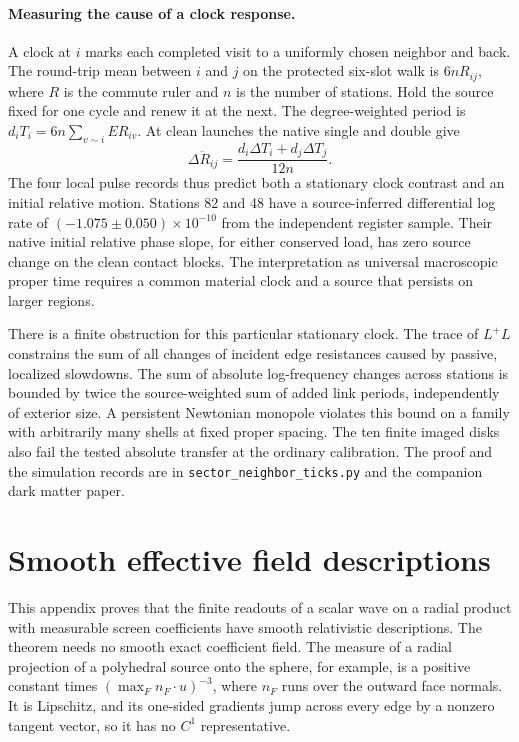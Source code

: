 \documentclass[11pt]{article}
\begin{document}
\paragraph{Measuring the cause of a clock response.}
A clock at \(i\) marks each completed visit to a uniformly chosen
neighbor and back. The round-trip mean between \(i\) and \(j\) on
the protected six-slot walk is \(6nR_{ij}\), where \(R\) is the
commute ruler and \(n\) is the number of stations. Hold the source
fixed for one cycle and renew it at the next. The degree-weighted
period is \(d_i T_i=6n\sum_{v\sim i}E R_{iv}\). At clean launches
the native single and double give
\[
  \Delta\ddot R_{ij}
    =\frac{d_i\Delta T_i+d_j\Delta T_j}{12n}.
\]
The four local pulse records thus predict both a stationary clock
contrast and an initial relative motion. Stations 82 and 48 have a
source-inferred differential log rate of
\((-1.075\pm0.050)\times10^{-10}\) from the independent register
sample. Their native initial relative phase slope, for either
conserved load, has zero source change on the clean contact blocks.
The interpretation as universal macroscopic proper time requires
a common material clock and a source that persists on larger regions.

There is a finite obstruction for this particular stationary clock.
The trace of \(L^+L\) constrains the sum of all changes of incident
edge resistances caused by passive, localized slowdowns. The sum of
absolute log-frequency changes across stations is bounded by twice
the source-weighted sum of added link periods, independently of
exterior size. A persistent Newtonian monopole violates this bound
on a family with arbitrarily many shells at fixed proper spacing.
The ten finite imaged disks also fail the tested absolute transfer
at the ordinary calibration. The proof and the simulation records
are in \texttt{sector\_neighbor\_ticks.py} and the companion dark
matter paper.

\appendix

\section{Smooth effective field descriptions}
\label{app:smooth-effective-descriptions}

This appendix proves that the finite readouts of a scalar wave on a radial
product with measurable screen coefficients have smooth relativistic
descriptions. The theorem needs no smooth exact coefficient field. The
measure of a radial projection of a polyhedral source onto the sphere, for
example, is a positive constant times $(\max_F n_F\cdot u)^{-3}$, where $n_F$
runs over the outward face normals. It is Lipschitz, and its one-sided
gradients jump across every edge by a nonzero tangent vector, so it has no
$C^1$ representative.
\end{document}
